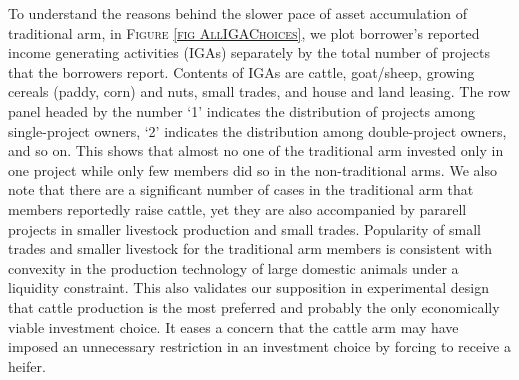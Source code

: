 % 
% 
	To understand the reasons behind the slower pace of asset accumulation of \textsf{traditional} arm, in \textsc{\small Figure \ref{fig AllIGAChoices}}, we plot borrower's reported income generating activities (IGAs) separately by the total number of projects that the borrowers report. Contents of IGAs are cattle, goat/sheep, growing cereals (paddy, corn) and nuts, small trades, and house and land leasing. The row panel headed by the number `1' indicates the distribution of projects among single-project owners, `2' indicates the distribution among double-project owners, and so on. This shows that almost no one of the \textsf{traditional} arm invested only in one project while only few members did so in the non-\textsf{traditional} arms. We also note that there are a significant number of cases in the \textsf{traditional} arm that members reportedly raise cattle, yet they are also accompanied by pararell projects in smaller livestock production and small trades. Popularity of small trades and smaller livestock for the \textsf{traditional} arm members is consistent with convexity in the production technology of large domestic animals under a liquidity constraint. This also validates our supposition in experimental design that cattle production is the most preferred and probably the only economically viable investment choice. It eases a concern that the \textsf{cattle} arm may have imposed an unnecessary restriction in an investment choice by forcing to receive a heifer. 




